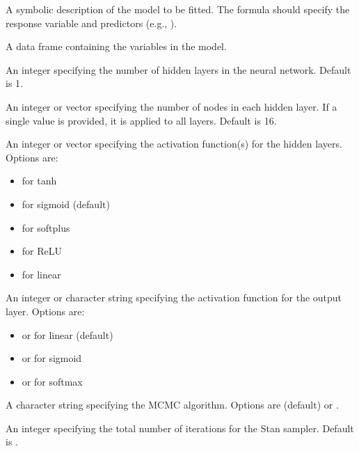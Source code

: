 \documentclass[a4paper]{book}
\begin{document}
\begin{Arguments}
\begin{ldescription}
\item[\code{formula}] A symbolic description of the model to be fitted. The formula should specify the response variable and predictors (e.g., ).

\item[\code{data}] A data frame containing the variables in the model.

\item[\code{L}] An integer specifying the number of hidden layers in the neural network. Default is 1.

\item[\code{nodes}] An integer or vector specifying the number of nodes in each hidden layer. If a single value is provided, it is applied to all layers. Default is 16.

\item[\code{act\_fn}] An integer or vector specifying the activation function(s) for the hidden layers. Options are:
\begin{itemize}

\item{}  for tanh
\item{}  for sigmoid (default)
\item{}  for softplus
\item{}  for ReLU
\item{}  for linear

\end{itemize}


\item[\code{out\_act\_fn}] An integer or character string specifying the activation function for the output layer. Options are:
\begin{itemize}

\item{}  or  for linear (default)
\item{}  or  for sigmoid
\item{}  or  for softmax

\end{itemize}


\item[\code{algorithm}] A character string specifying the MCMC algorithm. Options are  (default) or .

\item[\code{iter}] An integer specifying the total number of iterations for the Stan sampler. Default is .


\end{ldescription}
\end{Arguments}
\end{document}
